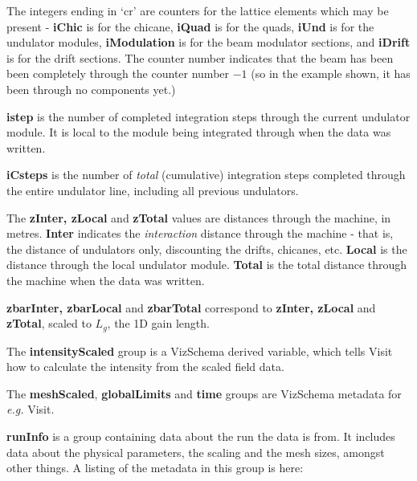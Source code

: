\documentclass[12pt]{article}%
\begin{document}
The integers ending in `cr' are counters for the lattice elements which may be present - {\bf iChic} is for the chicane, {\bf iQuad} is for the quads, {\bf iUnd} is for the undulator modules, {\bf iModulation} is for the beam modulator sections, and {\bf iDrift} is for the drift sections. The counter number indicates that the beam has been been completely through the counter number $-1$ (so in the example shown, it has been through no components yet.)

{\bf istep} is the number of completed integration steps through the current undulator module. It is local to the module being integrated through when the data was written.

{\bf iCsteps} is the number of \textit{total} (cumulative) integration steps completed through the entire undulator line, including all previous undulators.

The {\bf zInter, zLocal} and {\bf zTotal} values are distances through the machine, in metres. {\bf Inter} indicates the \textit{interaction} distance through the machine - that is, the distance of undulators only, discounting the drifts, chicanes, etc. {\bf Local} is the distance through the local undulator module. {\bf Total} is the total distance through the machine when the data was written.

{\bf zbarInter, zbarLocal} and {\bf zbarTotal} correspond to {\bf zInter, zLocal} and {\bf zTotal}, scaled to $L_g$, the 1D gain length.


The {\bf intensityScaled} group is a VizSchema derived variable, which tells Visit how to calculate the intensity from the scaled field data.

The {\bf meshScaled}, {\bf globalLimits} and {\bf time} groups are VizSchema metadata for \textit{e.g.} Visit.

{\bf runInfo} is a group containing data about the run the data is from. It includes data about the physical parameters, the scaling and the mesh sizes, amongst other things. A listing of the metadata in this group is here:
\end{document}
